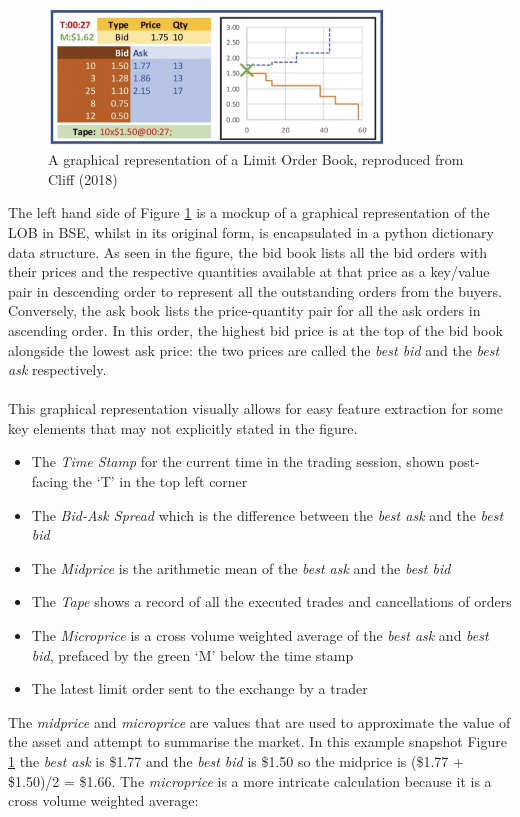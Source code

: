 \documentclass[ %
                    author={Ashwinder Khurana},
                supervisor={Prof Dave Cliff},
                    degree={MEng},
                     title={The Deeply Reinforced Trader},
                  subtitle={},
                      type={enterprise},
                      year={2020} ]{dissertation}
\begin{document}
\begin{figure}[H]
	\centering
	\includegraphics[width=0.8\textwidth]{LOB-Precross.png}
	\caption{A graphical representation of a Limit Order Book, reproduced from Cliff (2018)}
	\label{fig:Lob}  
\end{figure}
\noindent
The left hand side of Figure \ref{fig:Lob} is a mockup of a graphical representation of the LOB in BSE, whilst in its original form, is encapsulated in a python dictionary data structure.
As seen in the figure, the bid book lists all the bid orders with their prices and the respective quantities available at that price as a key/value pair in descending order to represent all the outstanding orders from the buyers. Conversely, the ask book lists the price-quantity pair for all the ask orders in ascending order. In this order, the highest bid price is at the top of the bid book alongside the lowest ask price: the two prices are called the \textit{best bid} and the \textit{best ask} respectively. 
\\
\\
This graphical representation visually allows for easy feature extraction for some key elements that may not explicitly stated in the figure. 
\begin{itemize}
\item The \textit{Time Stamp} for the current time in the trading session, shown post-facing the \enquote*{T} in the top left corner
\item The \textit{Bid-Ask Spread} which is the difference between the \textit{best ask} and the \textit{best bid}
\item The \textit{Midprice} is the arithmetic mean of the \textit{best ask} and the \textit{best bid}
\item The \textit{Tape} shows a record of all the executed trades and cancellations of orders
\item The \textit{Microprice} is a cross volume weighted average of the \textit{best ask} and \textit{best bid}, prefaced by the green \enquote*{M} below the time stamp
\item The latest limit order sent to the exchange by a trader

\end{itemize}
\noindent
The \textit{midprice} and \textit{microprice} are values that are used to approximate the value of the asset and attempt to summarise the market. In this example snapshot Figure \ref{fig:Lob} the \textit{best ask} is \$1.77 and the \textit{best bid} is \$1.50 so the midprice is (\$1.77 +  \$1.50)/2 = \$1.66. The \textit{microprice} is a more intricate calculation because it is a cross volume weighted average:
\end{document}
